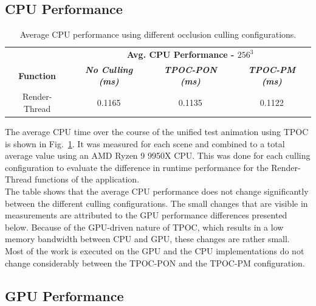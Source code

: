 \documentclass[conference]{IEEEtran}
\begin{document}
\subsection{CPU Performance} \label{subsec-cou-performance}

\begin{table}[htbp]
    \caption{Average \ac{CPU} performance using different occlusion culling configurations.}
    \begin{center}
        \begin{tabular}{|c|c|c|c|}
            \hline
            \textbf{}&\multicolumn{3}{|c|}{\textbf{Avg. \ac{CPU} Performance - $256^3$}} \\
            \cline{2-4} 
            \textbf{Function} & \textbf{\textit{No Culling (ms)}} & \textbf{\textit{\ac{TPOC-PON} (ms)}} & \textbf{\textit{\ac{TPOC-PM} (ms)}}  \\
            \hline
            Render-Thread      &  0.1165   & 0.1135    &  0.1122   \\
            \hline
        \end{tabular}
    \label{tab:cpu-performance}
    \end{center}
\end{table}

\noindent
The average \ac{CPU} time over the course of the unified test animation using \ac{TPOC} is 
shown in Fig.~\ref{tab:cpu-performance}. It was measured for each scene and combined to a total 
average value using an AMD Ryzen 9 9950X \ac{CPU}. This was done for each culling configuration to 
evaluate the difference in runtime performance for the Render-Thread functions of the application. \\

\noindent
The table shows that the average \ac{CPU} performance does not change significantly between the different 
culling configurations. The small changes that are visible in measurements are attributed to the \ac{GPU} 
performance differences presented below. Because of the \ac{GPU}-driven nature of \ac{TPOC}, which 
results in a low memory bandwidth between \ac{CPU} and \ac{GPU}, these changes are rather small. Most of 
the work is executed on the \ac{GPU} and the \ac{CPU} implementations do not change considerably between 
the \ac{TPOC-PON} and the \ac{TPOC-PM} configuration. \\


\subsection{GPU Performance} \label{subsec-gpu-performance}
\end{document}
